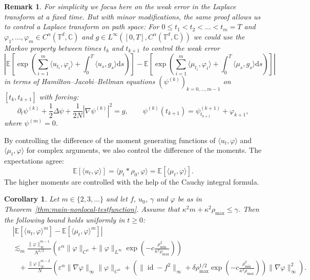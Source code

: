\documentclass[a4paper,12pt]{article}
\newcommand{\mathd}{\mathrm{d}}
\newtheorem{corollary}[theorem]{Corollary}
\newtheorem{remark}[theorem]{Remark}
\newcommand{\T}{\mathbb{T}}
\newcommand{\C}{\mathbb{C}}
\newcommand{\E}{\mathbb{E}}
\begin{document}
    \begin{remark}\label{rmk:multiple-times}
    For simplicity we focus here on the weak error in the Laplace transform at a fixed time. But with minor modifications, the same proof allows us to control a Laplace transform on path space: For $0 \leq t_1 < t_2 < \dots < t_m = T$ and $\varphi_1, \dots, \varphi_m \in C^\alpha(\T^d,\C)$ and $g \in L^\infty([0,T], C^\alpha(\T^d,\C))$ we could use the Markov property between times $t_k$ and $t_{k+1}$ to control the weak error
    \[
        \left|\E \left[\exp\left(\sum_{i=1}^m \langle u_{t_i}, \varphi_i \rangle + \int_0^T \langle u_s, g_s \rangle \mathd s\right)\right] - \E \left[\exp\left(\sum_{i=1}^m \langle \mu_{t_i}, \varphi_i \rangle + \int_0^T \langle \mu_s, g_s \rangle \mathd s\right)\right] \right|
    \]
    in terms of Hamilton--Jacobi--Bellman equations $(\psi^{(k)})_{k=0,\dots,m-1}$ on $[t_k,t_{k+1}]$ with forcing:
    \[
        \partial_t \psi^{(k)} + \frac12 \Delta \psi + \frac{1}{2N} |\nabla \psi^{(k)}|^2 = g,\qquad \psi^{(k)}(t_{k+1}) = \psi^{(k+1)}_{t_{k+1}}+\varphi_{k+1},
    \]
    where $\psi^{(m)}=0$.
\end{remark}


By controlling the difference of the moment generating functions of $\langle u_t,\varphi\rangle$ and $\langle \mu_t,\varphi\rangle$ for complex arguments, we also control the difference of the moments. The expectations agree:
\[
    \E[\langle u_t,\varphi\rangle] = \langle p_t \ast \rho_0,\varphi\rangle = \E[\langle \mu_t,\varphi\rangle].
\]
The higher moments are controlled with the help of the Cauchy integral formula.

\begin{corollary}\label{cor:moments}
    Let $m \in \{2,3,\dots\}$ and let $f$, $u_0$, $\gamma$ and $\varphi$ be as in Theorem~\ref{thm:main-nonlocal-testfunction}. Assume that $\kappa^2 m + \kappa^2\rho_{\max} \leq \gamma$. Then the following bound holds uniformly in $t \geq 0$:
    \begin{align*}
        &|\mathbb{E} [\langle u_t, \varphi \rangle^m] -\mathbb{E} [\langle
    \mu_t, \varphi \rangle^m] |   \\
    & \lesssim_m \frac{\|\varphi\|_\infty^{m-1}}{N^{1/2}} \left(\varepsilon^\alpha \|\varphi\|_{C^\alpha}
        + \|\varphi\|_{L^\infty} 
        \exp\left(-c \frac{\rho_{\min}^2}{\kappa^2\rho_{\max}}\right)\right)\\ \nonumber
    & \hspace{10pt}+ \frac{\|\varphi\|_\infty^{m-2}}{N} \left(\varepsilon^{\alpha} \|\nabla \varphi\|_\infty \| \varphi \|_{C^{\alpha}} + (\| \operatorname{id} - f^2 \|_{\infty} + \delta \rho_{\max}^{1/2} \exp\left(-c \frac{\rho_{\min}^2}{\kappa^2\rho_{\max}}\right)) \| \nabla \varphi \|_{\infty}^2\right).
    \end{align*}
\end{corollary}
\end{document}
